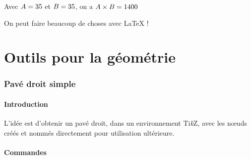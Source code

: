 \documentclass[a4paper,french,11pt]{article}
\providecommand\tikzlogo{Ti\textit{k}Z}
\let\TikZ\tikzlogo
\begin{document}
\begin{codetex}[]
\begin{PresentationCode}{}
\xdef\ValAleaA{\fpeval{randint(1,100)}}
\xdef\ValAleaB{\fpeval{randint(1,100)}}

Avec $A=\ValAleaA$ et $B=\ValAleaB$, on a $A\times B=\inteval{\ValAleaA * \ValAleaB}$
\end{PresentationCode}

\begin{PresentationCode}[DarkBlue]{}
On peut faire beaucoup de choses avec \LaTeX{} !
\end{PresentationCode}
\end{codetex}

\pagebreak

\part{Outils pour la géométrie}

\section{Pavé droit \og simple \fg}\label{pave}

\subsection{Introduction}

\begin{codeidee}
L'idée est d'obtenir un pavé droit, dans un environnement \TikZ, avec les nœuds créés et nommés directement pour utilisation ultérieure.
\end{codeidee}

\subsection{Commandes}

\begin{codetex}
\end{codetex}
\end{document}
